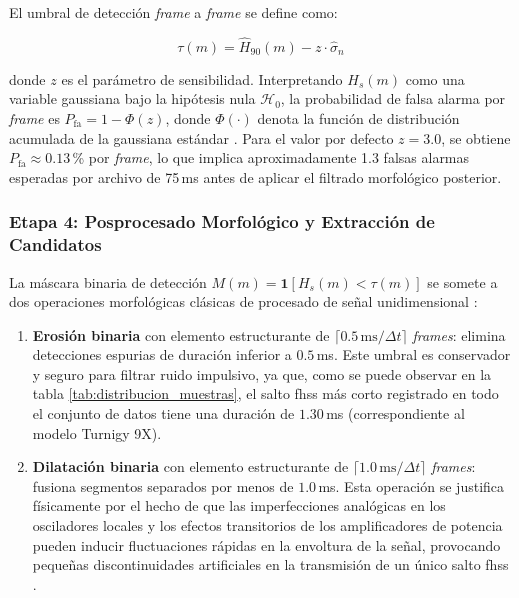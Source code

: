 \vspace{\baselineskip}

El umbral de detección \textit{frame} a \textit{frame} se define como:

\begin{equation}
    \tau(m) = \widehat{H}_{90}(m) - z \cdot \hat{\sigma}_n
    \label{eq:umbral_cfar}
\end{equation}

donde $z$ es el parámetro de sensibilidad. Interpretando $H_s(m)$ como una variable gaussiana bajo la hipótesis nula $\mathcal{H}_0$, la probabilidad de falsa alarma por \textit{frame} es $P_{\text{fa}} = 1 - \Phi(z)$, donde $\Phi(\cdot)$ denota la función de distribución acumulada de la gaussiana estándar \cite{kay_fundamentals_1998}. Para el valor por defecto $z = 3.0$, se obtiene $P_{\text{fa}} \approx 0.13$\,\% por \textit{frame}, lo que implica aproximadamente 1.3 falsas alarmas esperadas por archivo de 75\,ms antes de aplicar el filtrado morfológico posterior.

\subsubsection{Etapa 4: Posprocesado Morfológico y Extracción de Candidatos}

La máscara binaria de detección $M(m) = \mathbf{1}[H_s(m) < \tau(m)]$ se somete a dos operaciones morfológicas clásicas de procesado de señal unidimensional \cite{olesinski_radio_2023}:

\begin{enumerate}\itemsep 0em
    \item \textbf{Erosión binaria} con elemento estructurante de $\lceil 0.5\,\text{ms}/\Delta t \rceil$ \textit{frames}: elimina detecciones espurias de duración inferior a $0.5$\,ms. Este umbral es conservador y seguro para filtrar ruido impulsivo, ya que, como se puede observar en la tabla \ref{tab:distribucion_muestras}, el salto \gls{fhss} más corto registrado en todo el conjunto de datos tiene una duración de $1.30$\,ms (correspondiente al modelo Turnigy 9X).

    \item \textbf{Dilatación binaria} con elemento estructurante de $\lceil 1.0\,\text{ms}/\Delta t \rceil$ \textit{frames}: fusiona segmentos separados por menos de $1.0$\,ms. Esta operación se justifica físicamente por el hecho de que las imperfecciones analógicas en los osciladores locales y los efectos transitorios de los amplificadores de potencia pueden inducir fluctuaciones rápidas en la envoltura de la señal, provocando pequeñas discontinuidades artificiales en la transmisión de un único salto \gls{fhss} \cite{ezuma_micro-uav_2019, ezuma_detection_2020}.
\end{enumerate}

